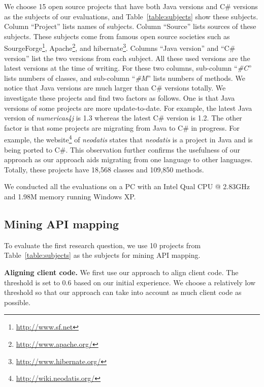 We choose 15 open source projects that have both Java versions and
C\# versions as the subjects of our evaluations, and
Table~\ref{table:subjects} show these subjects. Column ``Project''
lists names of subjects. Column ``Source'' lists sources of these
subjects. These subjects come from famous open source societies such
as SourgeForge\footnote{\url{http://www.sf.net}},
Apache\footnote{\url{http://www.apache.org/}}, and
hibernate\footnote{\url{http://www.hibernate.org/}}. Columns ``Java
version'' and ``C\# version'' list the two versions from each
subject. All these used versions are the latest versions at the time
of writing. For these two columns, sub-column ``\emph{\#C}'' lists
numbers of classes, and sub-column ``\emph{\#M}'' lists numbers of
methods. We notice that Java versions are much larger than C\#
versions totally. We investigate these projects and find two factors
as follows. One is that Java versions of some projects are more
update-to-date. For example, the latest Java version of
\emph{numericas4j} is 1.3 whereas the latest C\# version is 1.2. The
other factor is that some projects are migrating from Java to C\# in
progress. For example, the
website\footnote{\url{http://wiki.neodatis.org/}} of \emph{neodatis}
states that \emph{neodatis} is a project in Java and is being ported
to C\#. This observation further confirms the usefulness of our
approach as our approach aids migrating from one language to other
languages. Totally, these projects have 18,568 classes and 109,850
methods.

We conducted all the evaluations on a PC with an Intel Qual CPU @
2.83GHz and 1.98M memory running Windows XP.
\subsection{Mining API mapping}
\label{sec:evaluation:mining}

To evaluate the first research question, we use 10 projects from
Table~\ref{table:subjects} as the subjects for mining API mapping.


\textbf{Aligning client code.} We first use our approach to align
client code. The threshold is set to 0.6 based on our initial
experience. We choose a relatively low threshold so that our
approach can take into account as much client code as possible.

